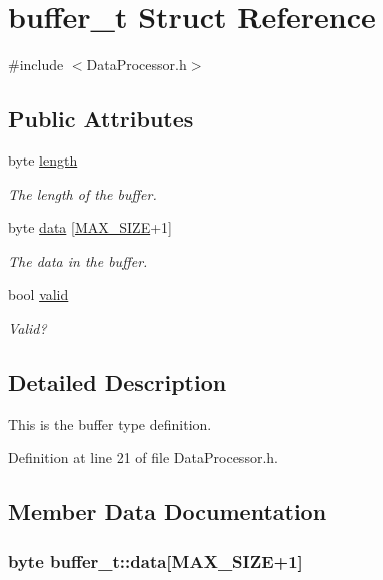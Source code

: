 \hypertarget{structbuffer__t}{\section{buffer\-\_\-t \-Struct \-Reference}
\label{structbuffer__t}
}


{\ttfamily \#include $<$\-Data\-Processor.\-h$>$}

\subsection*{\-Public \-Attributes}
\begin{DoxyCompactItemize}
\item 
byte \hyperlink{structbuffer__t_a5f6ea3ee1957ac885233051495e45596}{length}
\begin{DoxyCompactList}\small\item\em \-The length of the buffer. \end{DoxyCompactList}\item 
byte \hyperlink{structbuffer__t_af81a1018afd95d7e5ef1d974b9d30cc6}{data} \mbox{[}\hyperlink{_data_processor_8h_a0592dba56693fad79136250c11e5a7fe}{\-M\-A\-X\-\_\-\-S\-I\-Z\-E}+1\mbox{]}
\begin{DoxyCompactList}\small\item\em \-The data in the buffer. \end{DoxyCompactList}\item 
bool \hyperlink{structbuffer__t_ab8c6d50976afb6e0717a0dc6e6bde41c}{valid}
\begin{DoxyCompactList}\small\item\em \-Valid? \end{DoxyCompactList}\end{DoxyCompactItemize}


\subsection{\-Detailed \-Description}
\-This is the buffer type definition. 

\-Definition at line 21 of file \-Data\-Processor.\-h.



\subsection{\-Member \-Data \-Documentation}
\hypertarget{structbuffer__t_af81a1018afd95d7e5ef1d974b9d30cc6}{
\subsubsection[{data}]{\setlength{\rightskip}{0pt plus 5cm}byte {\bf buffer\-\_\-t\-::data}\mbox{[}{\bf \-M\-A\-X\-\_\-\-S\-I\-Z\-E}+1\mbox{]}}}\label{structbuffer__t_af81a1018afd95d7e5ef1d974b9d30cc6}


